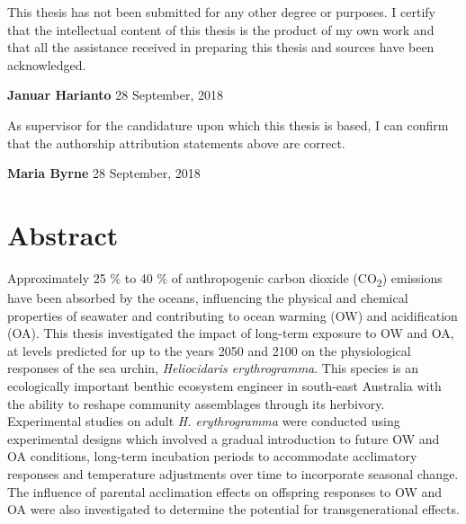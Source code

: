 \documentclass[a4paper,10pt, oneside]{memoir}
\begin{document}
This thesis has not been submitted for any other degree or purposes. I certify that the intellectual content of this thesis is the product of my own work and that all the assistance received in preparing this thesis and sources have been acknowledged.

\textbf{Januar Harianto} \textbar{}
28 September, 2018

As supervisor for the candidature upon which this thesis is based, I can confirm that the authorship attribution statements above are correct.

\textbf{Maria Byrne} \textbar{}
28 September, 2018

\cleardoublepage

\hypertarget{abstract}{%
\chapter*{Abstract}\label{abstract}}

Approximately 25 \% to 40 \% of anthropogenic carbon dioxide (CO\textsubscript{2}) emissions have been absorbed by the oceans, influencing the physical and chemical properties of seawater and contributing to ocean warming (OW) and acidification (OA).
This thesis investigated the impact of long-term exposure to OW and OA, at levels predicted for up to the years 2050 and 2100 on the physiological responses of the sea urchin, \emph{Heliocidaris erythrogramma}.
This species is an ecologically important benthic ecosystem engineer in south-east Australia with the ability to reshape community assemblages through its herbivory.
Experimental studies on adult \emph{H. erythrogramma} were conducted using experimental designs which involved a gradual introduction to future OW and OA conditions, long-term incubation periods to accommodate acclimatory responses and temperature adjustments over time to incorporate seasonal change.
The influence of parental acclimation effects on offspring responses to OW and OA were also investigated to determine the potential for transgenerational effects.
\end{document}

